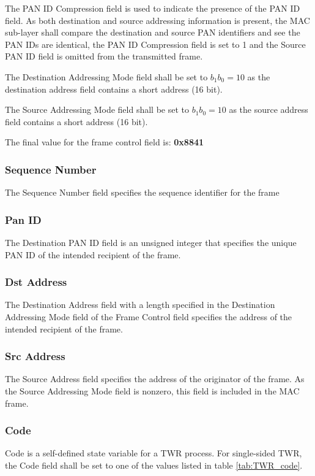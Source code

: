 \documentclass[\main/thesis.tex]{subfiles}
\begin{document}
The PAN ID Compression field is used to indicate the presence of the PAN ID field. As both destination and source addressing information is present, the MAC sub-layer shall compare the destination and source PAN identifiers and see the PAN IDs are identical, the PAN ID Compression field is set to 1 and the Source PAN ID field is omitted from the transmitted frame. 

The Destination Addressing Mode field shall be set to  $b_1 b_0 = 10$ as the destination address field contains a short address (16 bit).

The Source Addressing Mode field shall be set to  $b_1 b_0 = 10$ as the source address field contains a short address (16 bit).

The final value for the frame control field is: \textbf{0x8841}
\subsubsection{Sequence Number}
The Sequence Number field specifies the sequence identifier for the frame

\subsubsection{Pan ID}
The Destination PAN ID field is an unsigned integer that specifies the unique PAN ID of the intended recipient of the frame. 

\subsubsection{Dst Address}
The Destination Address field with a length specified in the Destination Addressing Mode field of the Frame Control field specifies the address of the intended recipient of the frame.

\subsubsection{Src Address}
The Source Address field specifies the address of the originator of the frame. As the Source Addressing Mode field is nonzero, this field is included in the MAC frame.

\subsubsection{Code}
Code is a self-defined state variable for a TWR process. For single-sided TWR, the Code field shall be set to one of the values listed in table \ref{tab:TWR_code}.
\end{document}
